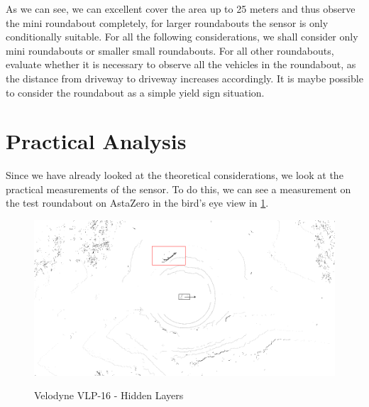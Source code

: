\documentclass[11pt,oneside,openright]{mpreport}
\begin{document}

As we can see, we can excellent cover the area up to 25 meters and thus observe the mini roundabout completely, for larger roundabouts the sensor is only conditionally suitable. 
For all the following considerations, we shall consider only mini roundabouts or smaller small roundabouts. 
For all other roundabouts, evaluate whether it is necessary to observe all the vehicles in the roundabout, as the distance from driveway to driveway increases accordingly.
It is maybe possible to consider the roundabout as a simple yield sign situation.

\section{Practical Analysis}

Since we have already looked at the theoretical considerations, we look at the practical measurements of the sensor.
To do this, we can see a measurement on the test roundabout on AstaZero in the bird's eye view in \cref{velodyne_hidden}.

\begin{figure}[!ht]
\caption{Velodyne VLP-16 - Hidden Layers}
\includegraphics[width=\textwidth]{bilder/velodyne_back.png}
\label{velodyne_hidden}
\end{figure}
\end{document}
